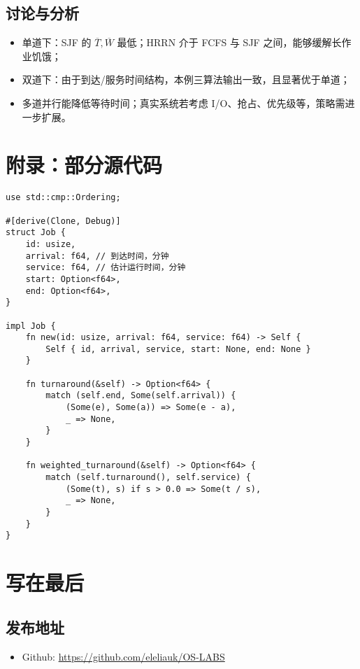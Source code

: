 \documentclass[12pt,hyperref,a4paper,UTF8]{ctexart}
\begin{document}
\subsection{讨论与分析}
\begin{itemize}
    \item 单道下：SJF 的 \(\overline{T},\overline{W}\) 最低；HRRN 介于 FCFS 与 SJF 之间，能够缓解长作业饥饿；
    \item 双道下：由于到达/服务时间结构，本例三算法输出一致，且显著优于单道；
    \item 多道并行能降低等待时间；真实系统若考虑 I/O、抢占、优先级等，策略需进一步扩展。
\end{itemize}

\section{附录：部分源代码}
\begin{verbatim}
use std::cmp::Ordering;

#[derive(Clone, Debug)]
struct Job {
    id: usize,
    arrival: f64, // 到达时间，分钟
    service: f64, // 估计运行时间，分钟
    start: Option<f64>,
    end: Option<f64>,
}

impl Job {
    fn new(id: usize, arrival: f64, service: f64) -> Self {
        Self { id, arrival, service, start: None, end: None }
    }

    fn turnaround(&self) -> Option<f64> {
        match (self.end, Some(self.arrival)) {
            (Some(e), Some(a)) => Some(e - a),
            _ => None,
        }
    }

    fn weighted_turnaround(&self) -> Option<f64> {
        match (self.turnaround(), self.service) {
            (Some(t), s) if s > 0.0 => Some(t / s),
            _ => None,
        }
    }
}

\end{verbatim}


\section{写在最后}
\subsection{发布地址}
\begin{itemize}
    \item Github: \url{https://github.com/eleliauk/OS-LABS}
\end{itemize}


\end{document}
